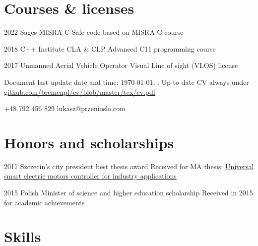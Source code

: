 \documentclass{tccv}
\begin{document}
\section{Courses \& licenses}

\begin{yearlist}

\item{2022}
     {Sages MISRA C}
     {Safe code based on MISRA C course}

\item{2018}
     {C++ Institute CLA \& CLP}
     {Advanced C11 programming course}

\item{2017}
     {Unmanned Aerial Vehicle Operator}
     {Visual Line of sight (VLOS) license}

\end{yearlist}

\vspace*{\fill} %

{\scriptsize Document last update date and time: \today, \currenttime. Up-to-date CV always under  \href{https://github.com/bremenpl/cv/blob/master/tex/cv.pdf}{github.com/bremenpl/cv/blob/master/tex/cv.pdf}}

    {+48 792 456 829}
    {lukasz@przenioslo.com}
    
\section{Honors and scholarships}

\begin{yearlist}

\item{2017}
     {Szczecin's city president best thesis award}
     {Received for MA thesis: \href{https://github.com/bremenpl/praca_mgr}{Universal smart electric motors controller for industry applications}} 
     
\item{2015}
     {Polish Minister of science and higher education scholarship}
     {Received in 2015 for academic achievements} 
    
\end{yearlist}

\section{Skills}
\end{document}
